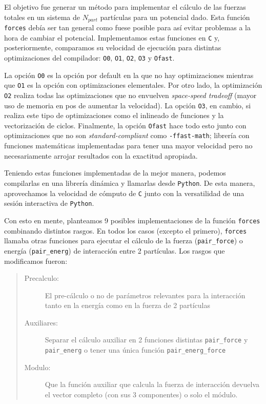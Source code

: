 El objetivo fue generar un método para implementar el cálculo de las fuerzas totales en un sistema de $N_{part}$ partículas para un potencial dado. 
Esta función \texttt{forces} debía ser tan general como fuese posible para así evitar problemas a la hora de cambiar el potencial. 
Implementamos estas funciones en \texttt{C} y, posteriormente, comparamos su velocidad de ejecución para distintas optimizaciones del compilador: \texttt{O0}, \texttt{O1}, \texttt{O2}, \texttt{O3} y \texttt{Ofast}. 

La opción \texttt{O0} es la opción por default en la que no hay optimizaciones mientras que \texttt{O1} es la opción con optimizaciones elementales. 
Por otro lado, la optimización \texttt{O2} realiza todas las optimizaciones que no envuelven \textit{space-speed tradeoff} (mayor uso de memoria en pos de aumentar la velocidad). La opción \texttt{O3}, en cambio, 
si realiza este tipo de optimizaciones como el inlineado de funciones y la vectorización de ciclos. 
Finalmente, la opción \texttt{Ofast} hace todo esto junto con optimizaciones que no son \textit{standard-compliant} como \texttt{-ffast-math}; librería con funciones matemáticas implementadas para tener una mayor 
velocidad pero no necesariamente arrojar resultados con la exactitud apropiada. 

Teniendo estas funciones implementadas de la mejor manera, podemos compilarlas en una librería dinámica y llamarlas desde \texttt{Python}.
De esta manera, aprovechamos la velocidad de cómputo de \texttt{C} junto con la versatilidad de una sesión interactiva de \texttt{Python}.

Con esto en mente, planteamos 9 posibles implementaciones de la función \texttt{forces} combinando distintos rasgos. 
En todos los casos (excepto el primero), \texttt{forces} llamaba otras funciones para ejecutar el cálculo de la fuerza (\texttt{pair\_force}) o energía (\texttt{pair\_energ}) de interacción entre 2 partículas. 
Los rasgos que modificamos fueron: 

\begin{quote}
\begin{description}
\item[Precalculo:] El pre-cálculo o no de parámetros relevantes para la interacción tanto en la energía como en la fuerza de 2 partículas

\item[Auxiliares:] Separar el cálculo auxiliar en 2 funciones distintas \texttt{pair\_force} y \texttt{pair\_energ} o tener una única función \texttt{pair\_energ\_force}

\item[Modulo:] Que la función auxiliar que calcula la fuerza de interacción devuelva el vector completo (con sus 3 componentes) o solo el módulo.
\end{description}
\end{quote}

